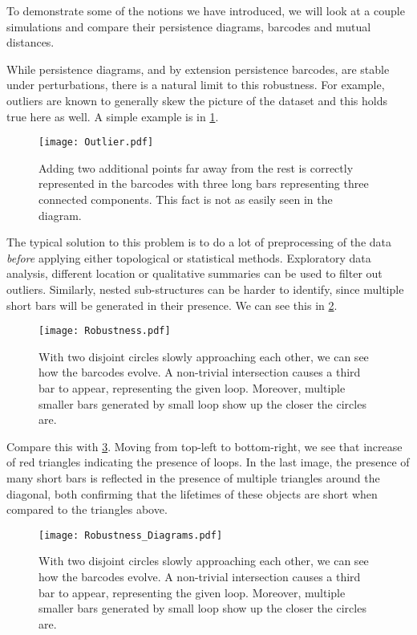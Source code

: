 To demonstrate some of the notions we have introduced, we will look at a couple simulations and compare their persistence diagrams, barcodes and mutual distances.

While persistence diagrams, and by extension persistence barcodes, are stable under perturbations, there is a natural limit to this robustness. For example, outliers are known to generally skew the picture of the dataset and this holds true here as well. A simple example is in \ref{fig:outlier}.

\begin{figure}[h!]
  \centering
  \texttt{[image: Outlier.pdf]}
  \caption{Adding two additional points far away from the rest is correctly represented in the barcodes with three long bars representing three connected components. This fact is not as easily seen in the diagram.}
  \label{fig:outlier}
\end{figure}

The typical solution to this problem is to do a lot of preprocessing of the data \textit{before} applying either topological or statistical methods. Exploratory data analysis, different location or qualitative summaries can be used to filter out outliers.
Similarly, nested sub-structures can be harder to identify, since multiple short bars will be generated in their presence. We can see this in \ref{fig:robust}.

\begin{figure}[h!]
  \centering
  \texttt{[image: Robustness.pdf]}
  \caption{With two disjoint circles slowly approaching each other, we can see how the barcodes evolve. A non-trivial intersection causes a third bar to appear, representing the given loop. Moreover, multiple smaller bars generated by small loop show up the closer the circles are.}
  \label{fig:robust}
\end{figure}

Compare this with \ref{fig:robust_diagrams}. Moving from top-left to bottom-right, we see that increase of red triangles indicating the presence of loops. In the last image, the presence of many short bars is reflected in the presence of multiple triangles around the diagonal, both confirming that the lifetimes of these objects are short when compared to the triangles above.

\begin{figure}[h!]
  \centering
  \texttt{[image: Robustness\_Diagrams.pdf]}
  \caption{With two disjoint circles slowly approaching each other, we can see how the barcodes evolve. A non-trivial intersection causes a third bar to appear, representing the given loop. Moreover, multiple smaller bars generated by small loop show up the closer the circles are.}
  \label{fig:robust_diagrams}
\end{figure}

